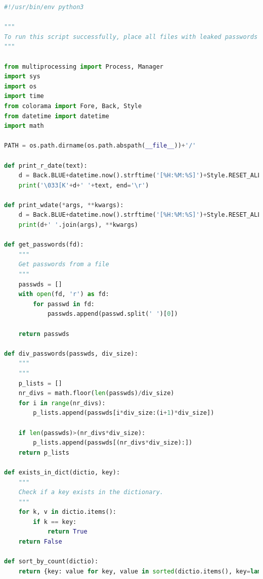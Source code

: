 \documentclass[a4paper,12pt]{article}
\begin{document}
\begin{lstlisting}[language=Python]
#!/usr/bin/env python3

"""
To run this script successfully, place all files with leaked passwords in the 'passwords' directory. The output will be written to the 'form' directory.
"""

from multiprocessing import Process, Manager
import sys
import os
import time
from colorama import Fore, Back, Style
from datetime import datetime
import math

PATH = os.path.dirname(os.path.abspath(__file__))+'/'

def print_r_date(text):
    d = Back.BLUE+datetime.now().strftime('[%H:%M:%S]')+Style.RESET_ALL
    print('\033[K'+d+' '+text, end='\r')

def print_wdate(*args, **kwargs):
    d = Back.BLUE+datetime.now().strftime('[%H:%M:%S]')+Style.RESET_ALL
    print(d+' '.join(args), **kwargs)

def get_passwords(fd):
    """
    Get passwords from a file
    """
    passwds = []
    with open(fd, 'r') as fd:
        for passwd in fd:
            passwds.append(passwd.split(' ')[0])

    return passwds

def div_passwords(passwds, div_size):
    """
    """
    p_lists = []
    nr_divs = math.floor(len(passwds)/div_size)
    for i in range(nr_divs):
        p_lists.append(passwds[i*div_size:(i+1)*div_size])

    if len(passwds)>(nr_divs*div_size):
        p_lists.append(passwds[(nr_divs*div_size):])
    return p_lists

def exists_in_dict(dictio, key):
    """
    Check if a key exists in the dictionary.
    """
    for k, v in dictio.items():
        if k == key:
            return True
    return False

def sort_by_count(dictio):
    return {key: value for key, value in sorted(dictio.items(), key=lambda item: item[1])}


\end{lstlisting}
\end{document}
